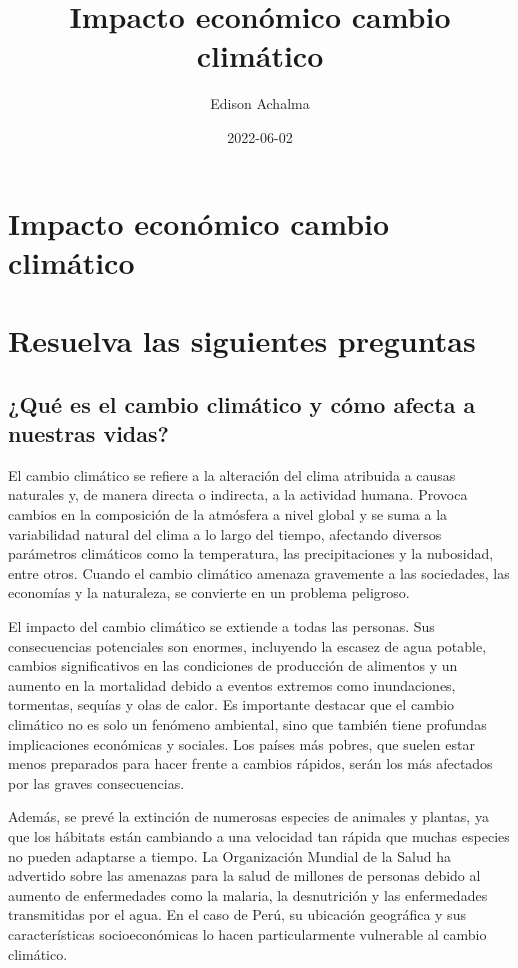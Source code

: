 \documentclass[
  stu,
  floatsintext,
  longtable,
  a4paper,
  nolmodern,
  notxfonts,
  notimes,
  12pt,
  colorlinks=true,linkcolor=blue,citecolor=blue,urlcolor=blue]{apa7}
\title{Impacto económico cambio climático}
\author{Edison Achalma}
\affiliation{
{Escuela Profesional de Economía, Universidad Nacional de San Cristóbal
de Huamanga}}
\date{2022-06-02}
\begin{document}
\maketitle


\hypertarget{toc}{}
\tableofcontents
\newpage
\section[Introduction]{Impacto económico cambio climático}

\setcounter{secnumdepth}{3}

\setlength\LTleft{0pt}




\section{Resuelva las siguientes
preguntas}\label{resuelva-las-siguientes-preguntas}

\subsection{¿Qué es el cambio climático y cómo afecta a nuestras
vidas?}\label{quuxe9-es-el-cambio-climuxe1tico-y-cuxf3mo-afecta-a-nuestras-vidas}

El cambio climático se refiere a la alteración del clima atribuida a
causas naturales y, de manera directa o indirecta, a la actividad
humana. Provoca cambios en la composición de la atmósfera a nivel global
y se suma a la variabilidad natural del clima a lo largo del tiempo,
afectando diversos parámetros climáticos como la temperatura, las
precipitaciones y la nubosidad, entre otros. Cuando el cambio climático
amenaza gravemente a las sociedades, las economías y la naturaleza, se
convierte en un problema peligroso.

El impacto del cambio climático se extiende a todas las personas. Sus
consecuencias potenciales son enormes, incluyendo la escasez de agua
potable, cambios significativos en las condiciones de producción de
alimentos y un aumento en la mortalidad debido a eventos extremos como
inundaciones, tormentas, sequías y olas de calor. Es importante destacar
que el cambio climático no es solo un fenómeno ambiental, sino que
también tiene profundas implicaciones económicas y sociales. Los países
más pobres, que suelen estar menos preparados para hacer frente a
cambios rápidos, serán los más afectados por las graves consecuencias.

Además, se prevé la extinción de numerosas especies de animales y
plantas, ya que los hábitats están cambiando a una velocidad tan rápida
que muchas especies no pueden adaptarse a tiempo. La Organización
Mundial de la Salud ha advertido sobre las amenazas para la salud de
millones de personas debido al aumento de enfermedades como la malaria,
la desnutrición y las enfermedades transmitidas por el agua. En el caso
de Perú, su ubicación geográfica y sus características socioeconómicas
lo hacen particularmente vulnerable al cambio climático.
\end{document}
